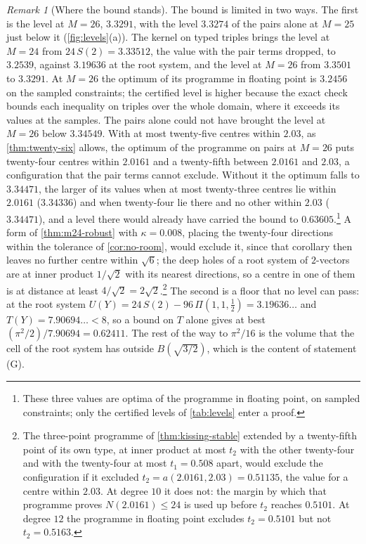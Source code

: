 \documentclass[11pt,reqno]{amsart}
\renewcommand{\_}{\origunderscore\allowbreak}
\numberwithin{equation}{section}
\theoremstyle{plain}
\theoremstyle{definition}
\theoremstyle{remark}
\newtheorem{remark}[thm]{Remark}
\begin{document}
\begin{remark}[Where the bound stands]
The bound is limited in two ways. The first is the level at $M=26$,
$3.3291$, with the level $3.3274$ of the pairs alone at $M=25$ just below it
(\cref{fig:levels}(a)). The kernel on typed triples brings the level at
$M=24$ from $24\,S(2)=3.33512$, the value with the pair terms dropped, to
$3.2539$, against $3.19636$ at the root system, and the level at $M=26$ from
$3.3501$ to $3.3291$. At $M=26$ the optimum of its programme in floating
point is $3.2456$ on the sampled constraints; the certified level is higher
because the exact check bounds each inequality on triples over the whole
domain, where it exceeds its values at the samples. The pairs alone could
not have brought the level at $M=26$ below $3.34549$.
With at most twenty-five centres within $2.03$, as
\cref{thm:twenty-six} allows, the optimum of the programme on pairs at $M=26$ puts
twenty-four centres within $2.0161$ and a twenty-fifth between $2.0161$ and
$2.03$, a configuration that the pair terms cannot exclude. Without it the
optimum falls to $3.34471$, the larger of its values when at most
twenty-three centres lie within $2.0161$ ($3.34336$) and when twenty-four
lie there and no other within $2.03$ ($3.34471$), and a level there would
already have carried the bound to $0.63605$.\footnote{These
  three values are optima of the programme in floating point, on sampled
  constraints; only the certified levels of \cref{tab:levels} enter a
  proof.} A form of \cref{thm:m24-robust} with $\kappa=0.008$,
placing the twenty-four directions within the tolerance of
\cref{cor:no-room}, would exclude it, since that corollary then leaves no
further centre within $\sqrt6$; the deep holes of a root system of
$2$-vectors are at inner product $1/\sqrt2$ with its nearest directions, so
a centre in one of them is at distance at least $4/\sqrt2=2\sqrt2$.\footnote{The three-point programme of
  \cref{thm:kissing-stable} extended by a twenty-fifth point of its own type,
  at inner product at most $t_2$ with the other twenty-four and with the
  twenty-four at most $t_1=0.508$ apart, would exclude the configuration if
  it excluded $t_2=a(2.0161,2.03)=0.51135$, the value for a centre within
  $2.03$. At degree $10$ it does not: the margin by which that programme
  proves $N(2.0161)\le24$ is used up before $t_2$ reaches $0.5101$. At degree
  $12$ the programme in floating point excludes $t_2=0.5101$ but not
  $t_2=0.5163$.} The second is a floor that no
level can pass: at the root system $U(Y)=24\,S(2)-96\,\Pi(1,1,\tfrac12)=3.19636\ldots$
and $T(Y)=7.90694\ldots<8$, so a bound on $T$ alone gives at best
$(\pi^2/2)/7.90694=0.62411$. The rest of the way to $\pi^2/16$ is the volume
that the cell of the root system has outside $B(\sqrt{3/2})$, which is the
content of statement (G).
\end{remark}
\end{document}
